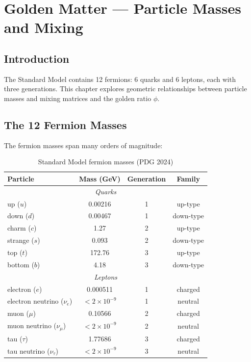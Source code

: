 \chapter{Golden Matter — Particle Masses and Mixing}
\label{ch:20}

\section{Introduction}

The Standard Model contains 12 fermions: 6 quarks and 6 leptons, each with three generations. This chapter explores geometric relationships between particle masses and mixing matrices and the golden ratio $\phi$.

\section{The 12 Fermion Masses}

The fermion masses span many orders of magnitude:

\begin{table}[h]
\centering
\begin{tabular}{lccc}
\hline
Particle & Mass (GeV) & Generation & Family \\
\hline
\multicolumn{4}{c}{\textit{Quarks}} \\
up ($u$) & 0.00216 & 1 & up-type \\
down ($d$) & 0.00467 & 1 & down-type \\
charm ($c$) & 1.27 & 2 & up-type \\
strange ($s$) & 0.093 & 2 & down-type \\
top ($t$) & 172.76 & 3 & up-type \\
bottom ($b$) & 4.18 & 3 & down-type \\
\hline
\multicolumn{4}{c}{\textit{Leptons}} \\
electron ($e$) & 0.000511 & 1 & charged \\
electron neutrino ($\nu_e$) & $< 2\times10^{-9}$ & 1 & neutral \\
muon ($\mu$) & 0.10566 & 2 & charged \\
muon neutrino ($\nu_\mu$) & $< 2\times10^{-9}$ & 2 & neutral \\
tau ($\tau$) & 1.77686 & 3 & charged \\
tau neutrino ($\nu_\tau$) & $< 2\times10^{-9}$ & 3 & neutral \\
\hline
\end{tabular}
\caption{Standard Model fermion masses (PDG 2024)}
\end{table}

